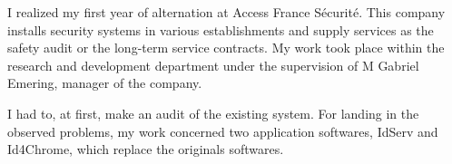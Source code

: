 I realized my first year of alternation at Access France Sécurité. This company installs security systems in various establishments and supply services as the safety audit or the long-term service contracts. My work took place within the research and development department under the supervision of M Gabriel Emering, manager of the company.

I had to, at first, make an audit of the existing system. For landing in the observed problems, my work concerned two application softwares, IdServ and Id4Chrome, which replace the originals softwares.